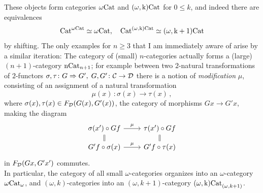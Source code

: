         These objects form categories $\mathrm{\omega Cat}$ and $\mathrm{(\omega, k)Cat}$ for $0 \leq k$, and indeed there are equivalences
        \begin{equation*}
            \operatorname{Cat}^{\mathrm{\omega Cat}} \simeq \mathrm{\omega Cat}, \quad \operatorname{Cat}^{\mathrm{(\omega, k)Cat}} \simeq \mathrm{(\omega, k+1)Cat}
        \end{equation*}
        by shifting.
        The only examples for $n \geq 3$ that I am immediately aware of arise by a similar iteration: The category of (small) $n$-categories actually forms a (large) $(n+1)$-category $\mathrm{nCat}_{n+1}$; for example between two $2$-natural transformations of $2$-functors $\sigma, \tau \colon G \Rightarrow G', \; G, G' \colon \mathcal{C} \to \mathcal{D}$ there is a notion of \emph{modification} $\mu$, consisting of an assignment of a natural transformation
        \begin{equation*}
            \mu(x) \,\colon \sigma(x) \to \tau(x) \,,
        \end{equation*}
        where $\sigma(x), \tau(x) \in F_{\mathcal{D}}(G(x), G'(x))$, the category of morphisms $Gx \to G'x$, making the diagram
        \begin{equation*}
            \begin{tikzcd}[row sep=small]
                \sigma(x') \circ Gf \arrow[r, "\mu"] \arrow[d, equal] & \tau(x') \circ Gf \arrow[d, equal] \\
                G'f \circ \sigma(x) \arrow[r, "\mu"] & G'f \circ \tau(x)
            \end{tikzcd}
        \end{equation*}
        in $F_{\mathcal{D}}(Gx, G'x')$ commutes. \\
        In particular, the category of all small $\omega$-categories organizes into an $\omega$-category $\mathrm{\omega Cat}_{\omega}$, and $(\omega, k)$-categories into an $(\omega, k+1)$-category $\mathrm{(\omega,k)Cat}_{(\omega,k+1)}$.

